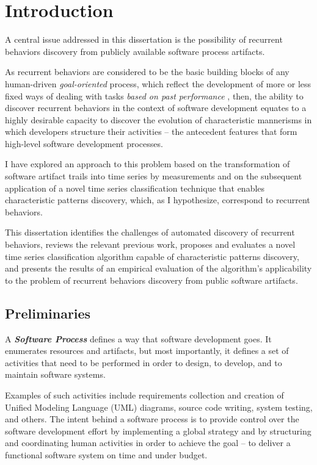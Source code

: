 \chapter{Introduction}\label{chapter_introduction}
A central issue addressed in this dissertation is the possibility of recurrent behaviors discovery 
from publicly available software process artifacts. 

As recurrent behaviors are considered to be the basic building blocks of any human-driven
\textit{goal-oriented} process, which reflect the development of more or less fixed ways of dealing 
with tasks \textit{based on past performance} \cite{neal2012habits} \cite{1903}, 
then, the ability to discover recurrent behaviors in the context of software development equates 
to a highly desirable capacity to discover the evolution of characteristic mannerisms in which developers 
structure their activities -- the antecedent features that form high-level software development processes. 

I have explored an approach to this problem based on the transformation of software artifact trails 
into time series by measurements and on the subsequent application of a novel time series 
classification technique that enables characteristic patterns discovery, which, as
I hypothesize, correspond to recurrent behaviors.

This dissertation identifies the challenges of automated discovery of recurrent behaviors, 
reviews the relevant previous work, proposes and evaluates a novel time series classification algorithm capable of characteristic patterns discovery, 
and presents the results of an empirical evaluation of the algorithm's applicability to the problem 
of recurrent behaviors discovery from public software artifacts.

\section{Preliminaries}\label{section_terminology}
\begin{defn}\label{def_process}
A \textbf{\textit{Software Process}} defines a way that software development goes. It enumerates
resources and artifacts, but most importantly, it defines a set of activities that need to be 
performed in order to design, to develop, and to maintain software systems.
\end{defn}
Examples of such activities include requirements collection and creation of Unified Modeling Language (UML) diagrams, 
source code writing, system testing, and others. The intent behind a software process is to provide 
control over the software development effort by implementing a global strategy and by structuring
and coordinating human activities in order to achieve the goal -- to deliver a functional
software system on time and under budget. 

